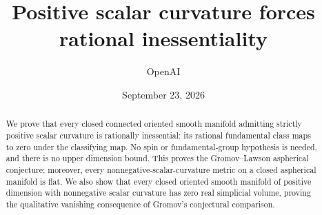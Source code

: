 \documentclass[11pt]{article}
\title{Positive scalar curvature forces rational inessentiality}
\author{OpenAI}
\date{September 23, 2026}
\numberwithin{equation}{section}
\theoremstyle{definition}
\begin{document}
\maketitle
\begin{abstract}
We prove that every closed connected oriented smooth manifold admitting
strictly positive scalar curvature is rationally inessential: its rational
fundamental class maps to zero under the classifying map. No spin or
fundamental-group hypothesis is needed, and there is no upper dimension bound.
This proves the Gromov--Lawson aspherical conjecture; moreover, every
nonnegative-scalar-curvature metric on a closed aspherical manifold is flat.
We also show that every closed oriented smooth manifold of positive dimension
with nonnegative scalar curvature has zero real simplicial volume, proving the
qualitative vanishing consequence of Gromov's conjectural comparison.
\end{abstract}
\begingroup
\small
\tableofcontents
\endgroup








\begingroup
\small
{}
{}
\let\originalthebibliography\thebibliography
\renewcommand{\thebibliography}[1]{%
  \originalthebibliography{#1}\setlength{\itemsep}{1pt}}


\endgroup
\end{document}
